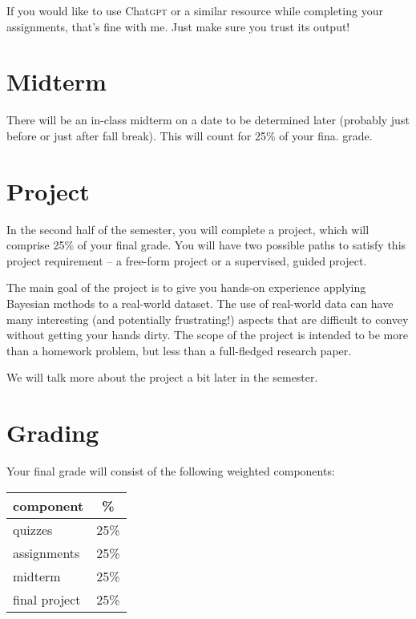 \documentclass{article}
\newcommand{\acro}[1]{\textsc{\MakeLowercase{#1}}}
\begin{document}
If you would like to use Chat\acro{GPT} or a similar resource while completing
your assignments, that's fine with me. Just make sure you trust its output!

\section*{Midterm}

There will be an in-class midterm on a date to be determined later
(probably just before or just after fall break). This will count for 25\% of your
fina. grade.

\section*{Project}

In the second half of the semester, you will complete a project, which will
comprise 25\% of your final grade.  You will have two possible paths to satisfy
this project requirement -- a free-form project or a supervised, guided project.

The main goal of the project is to give you hands-on experience applying
Bayesian methods to a real-world dataset.  The use of real-world data can have
many interesting (and potentially frustrating!) aspects that are difficult to
convey without getting your hands dirty.  The scope of the project is intended
to be more than a homework problem, but less than a full-fledged research paper.

We will talk more about the project a bit later in the semester.

\section*{Grading}

Your final grade will consist of the following weighted components:
\begin{center}
  \begin{tabular}{lc}
    \toprule
    component                    &   \% \\
    \midrule
    quizzes                      & 25\% \\
    assignments                  & 25\% \\
    midterm                      & 25\% \\
    final project                & 25\% \\
    \bottomrule
  \end{tabular}
\end{center}
\end{document}
